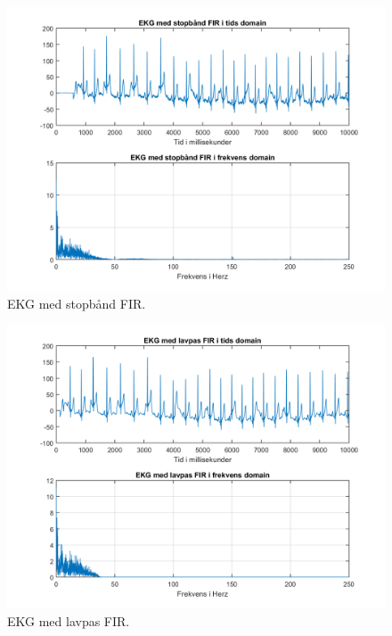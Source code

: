 \documentclass[12pt, letterpaper]{article}
\begin{document}
\begin{figure}[!h]
           \includegraphics[width=\linewidth]{billeder/EKGstopbandFIR}	   							\caption{EKG med stopbånd FIR.}
\end{figure}

\begin{figure}[!h]
           \includegraphics[width=\linewidth]{billeder/EKGlavpasFIR}	   							\caption{EKG med lavpas FIR.}
\end{figure}
\end{document}
